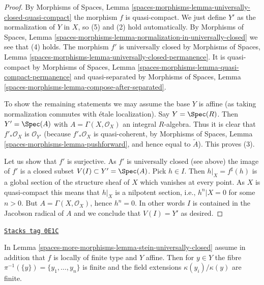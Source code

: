 \begin{proof}
By Morphisms of Spaces, Lemma
\ref{spaces-morphisms-lemma-universally-closed-quasi-compact}
the morphism $f$ is quasi-compact.
We just define $Y'$ as the normalization of $Y$ in $X$, so (5) and (2) hold
automatically. By
Morphisms of Spaces, Lemma
\ref{spaces-morphisms-lemma-normalization-in-universally-closed}
we see that (4) holds. The morphism $f'$ is universally closed by
Morphisms of Spaces, Lemma
\ref{spaces-morphisms-lemma-universally-closed-permanence}.
It is quasi-compact by
Morphisms of Spaces, Lemma
\ref{spaces-morphisms-lemma-quasi-compact-permanence}
and quasi-separated by
Morphisms of Spaces, Lemma
\ref{spaces-morphisms-lemma-compose-after-separated}.

\medskip\noindent
To show the remaining statements we may assume the base $Y$ is affine
(as taking normalization commutes with \'etale localization).
Say $Y = \Spec(R)$. Then $Y' = \Spec(A)$ with
$A = \Gamma(X, \mathcal{O}_X)$ an integral $R$-algebra.
Thus it is clear that $f'_*\mathcal{O}_X$
is $\mathcal{O}_{Y'}$ (because $f'_*\mathcal{O}_X$ is quasi-coherent,
by Morphisms of Spaces, Lemma
\ref{spaces-morphisms-lemma-pushforward},
and hence equal to $\widetilde{A}$). This proves (3).

\medskip\noindent
Let us show that $f'$ is surjective. As $f'$ is universally closed (see above)
the image of $f'$ is a closed subset
$V(I) \subset Y' = \Spec(A)$. Pick $h \in I$. Then
$h|_X = f^\sharp(h)$ is a global section of the structure sheaf of
$X$ which vanishes at every point. As $X$ is quasi-compact this means
that $h|_X$ is a nilpotent section, i.e., $h^n|X = 0$ for some $n > 0$.
But $A = \Gamma(X, \mathcal{O}_X)$, hence $h^n = 0$.
In other words $I$ is contained in the Jacobson radical of $A$ and we conclude
that $V(I) = Y'$ as desired.
\end{proof}

\begin{lemma}
\label{spaces-more-morphisms-lemma-stein-universally-closed-residue-fields}
\href{https://stacks.math.columbia.edu/tag/0E1C}{\texttt{Stacks tag 0E1C}}

In Lemma \ref{spaces-more-morphisms-lemma-stein-universally-closed} assume in addition that
$f$ is locally of finite type and $Y$ affine. Then for $y \in Y$ the fibre
$\pi^{-1}(\{y\}) = \{y_1, \ldots, y_n\}$ is finite and the field extensions
$\kappa(y_i)/\kappa(y)$ are finite.
\end{lemma}


